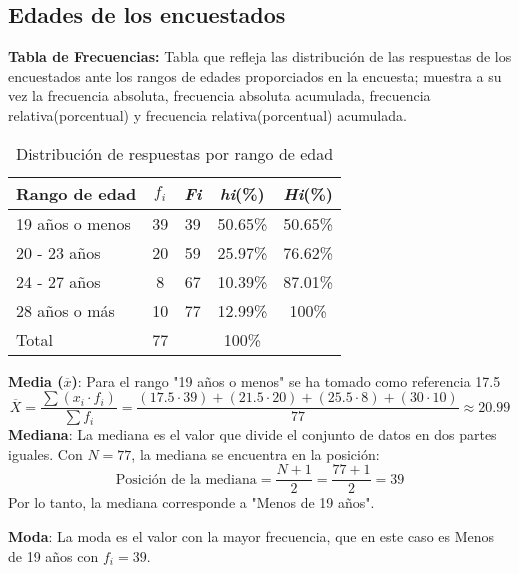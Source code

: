 \subsection{Edades de los encuestados}
	\textbf{Tabla de Frecuencias:}
	Tabla que refleja las distribución de las respuestas de los encuestados ante los rangos de edades proporciados en la encuesta; muestra a su vez la frecuencia absoluta, frecuencia absoluta acumulada, frecuencia relativa(porcentual) y frecuencia relativa(porcentual) acumulada.
	
	\begin{table}[h!]
		\centering
		\renewcommand{\arraystretch}{1.2} %
		\begin{tabular}{l c c c c}
			\hline
			{Rango de edad} & {\(f_i\)} & \textit{Fi} & \textit{hi}(\%) & \textit{Hi}(\%)\\
			\hline
			19 años o menos   & 39 & 39 & 50.65\% & 50.65\%\\
			20 - 23 años       & 20 & 59 & 25.97\% & 76.62\%\\
			24 - 27 años       & 8  & 67 & 10.39\% & 87.01\%\\
			28 años o más      & 10 & 77 & 12.99\% & 100\%\\
			\hline
			Total			   & 77 & & 100\% \\
			\hline
		\end{tabular}
		\caption{Distribución de respuestas por rango de edad}
		\label{tabla:edad}
	\end{table}
	
	\textbf{Media (\(\overline{x}\))}: Para el rango "19 años o menos" se ha tomado como referencia 17.5
	\begin{equation*}
		\overline{X} = \frac{\sum (x_i \cdot f_i)}{\sum f_i} = \frac{(17.5 \cdot 39) + (21.5 \cdot 20) + (25.5 \cdot 8) + (30 \cdot 10)}{77} \approx 20.99
	\end{equation*}
	\textbf{Mediana}:
	La mediana es el valor que divide el conjunto de datos en dos partes iguales. Con \(N = 77\), la mediana se encuentra en la posición:
	\begin{equation*}
		\text{Posición de la mediana} = \frac{N + 1}{2} = \frac{77 + 1}{2} = 39
	\end{equation*}
	Por lo tanto, la mediana corresponde a "Menos de 19 años".
	
	\textbf{Moda}: La moda es el valor con la mayor frecuencia, que en este caso es Menos de 19 años con \(f_i = 39\).


